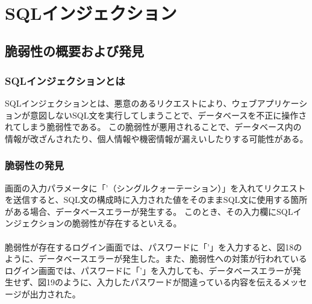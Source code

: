 \documentclass[dvipdfmx,autodetect-engine,titlepage]{jsarticle}
\begin{document}
　\\

\section{SQLインジェクション}
\subsection{脆弱性の概要および発見}
\subsubsection{SQLインジェクションとは}
SQLインジェクションとは、悪意のあるリクエストにより、ウェブアプリケーションが意図しないSQL文を実行してしまうことで、データベースを不正に操作されてしまう脆弱性である。
この脆弱性が悪用されることで、データベース内の情報が改ざんされたり、個人情報や機密情報が漏えいしたりする可能性がある。\\

\subsubsection{脆弱性の発見}
画面の入力パラメータに「'（シングルクォーテーション）」を入れてリクエストを送信すると、SQL文の構成時に入力された値をそのままSQL文に使用する箇所がある場合、データベースエラーが発生する。
このとき、その入力欄にSQLインジェクションの脆弱性が存在するといえる。\\\\
脆弱性が存在するログイン画面では、パスワードに「'」を入力すると、図18のように、データベースエラーが発生した。また、脆弱性への対策が行われているログイン画面では、パスワードに「'」を入力しても、データベースエラーが発生せず、図19のように、入力したパスワードが間違っている内容を伝えるメッセージが出力された。
\end{document}
